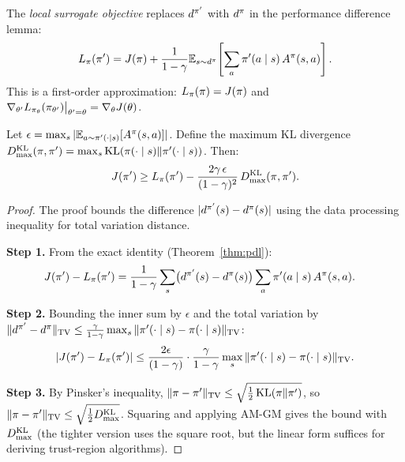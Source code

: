 \documentclass[11pt,a4paper]{article}
\begin{document}
\begin{definition}
\label{def:surrogate}
The \emph{local surrogate objective} replaces $d^{\pi'}$ with
$d^\pi$ in the performance difference lemma:
\[
  L_\pi(\pi') = J(\pi) + \frac{1}{1-\gamma}
  \mathbb{E}_{s \sim d^\pi}\!\left[\sum_a \pi'(a \mid s)\,
  A^\pi(s,a)\right].
\]
This is a first-order approximation: $L_\pi(\pi) = J(\pi)$
and $\nabla_{\theta'} L_{\pi_\theta}(\pi_{\theta'})
\big|_{\theta' = \theta} = \nabla_\theta J(\theta)$.
\end{definition}

\begin{theorem}
\label{thm:cpi}
Let $\epsilon = \max_s |\mathbb{E}_{a \sim \pi'(\cdot \mid s)}
[A^\pi(s,a)]|$. Define the maximum KL divergence
$D_{\max}^{\operatorname{KL}}(\pi, \pi') = \max_s
\operatorname{KL}(\pi(\cdot \mid s) \| \pi'(\cdot \mid s))$. Then:
\[
  J(\pi') \geq L_\pi(\pi')
  - \frac{2\gamma\, \epsilon}{(1-\gamma)^2}\,
  D_{\max}^{\operatorname{KL}}(\pi, \pi').
\]
\end{theorem}

\begin{proof}
The proof bounds the difference $|d^{\pi'}(s) - d^\pi(s)|$
using the data processing inequality for total variation distance.

\textbf{Step 1.} From the exact identity (Theorem~\ref{thm:pdl}):
\begin{align*}
  J(\pi') - L_\pi(\pi')
  &= \frac{1}{1-\gamma} \sum_s \bigl(d^{\pi'}(s) - d^\pi(s)\bigr)
    \sum_a \pi'(a \mid s)\, A^\pi(s,a).
\end{align*}

\textbf{Step 2.} Bounding the inner sum by $\epsilon$ and the total
variation by
$\|d^{\pi'} - d^\pi\|_{\mathrm{TV}} \leq
\frac{\gamma}{1-\gamma} \max_s \|\pi'(\cdot \mid s) -
\pi(\cdot \mid s)\|_{\mathrm{TV}}$:
\[
  |J(\pi') - L_\pi(\pi')| \leq
  \frac{2\epsilon}{(1-\gamma)} \cdot
  \frac{\gamma}{1-\gamma} \max_s
  \|\pi'(\cdot \mid s) - \pi(\cdot \mid s)\|_{\mathrm{TV}}.
\]

\textbf{Step 3.} By Pinsker's inequality,
$\|\pi - \pi'\|_{\mathrm{TV}} \leq
\sqrt{\frac{1}{2} \operatorname{KL}(\pi \| \pi')}$, so
$\|\pi - \pi'\|_{\mathrm{TV}} \leq
\sqrt{\frac{1}{2} D_{\max}^{\operatorname{KL}}}$.
Squaring and applying AM-GM gives the bound with
$D_{\max}^{\operatorname{KL}}$ (the tighter version uses the square root, but the
linear form suffices for deriving trust-region algorithms).
\end{proof}
\end{document}
